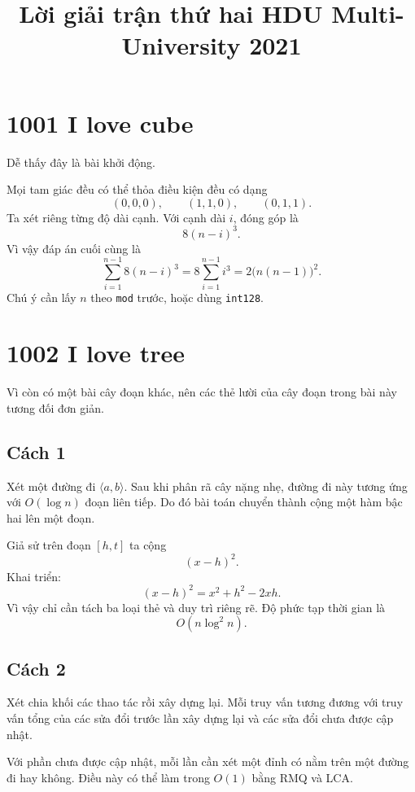 \documentclass[11pt]{article}
\title{Lời giải trận thứ hai HDU Multi-University 2021}
\author{}
\date{}
\begin{document}
\maketitle


\section{1001 I love cube}

Dễ thấy đây là bài khởi động.

Mọi tam giác đều có thể thỏa điều kiện đều có dạng
\[
  (0,0,0),\qquad (1,1,0),\qquad (0,1,1).
\]
Ta xét riêng từng độ dài cạnh. Với cạnh dài $i$, đóng góp là
\[
  8(n-i)^3.
\]
Vì vậy đáp án cuối cùng là
\[
  \sum_{i=1}^{n-1} 8(n-i)^3
  = 8\sum_{i=1}^{n-1} i^3
  = 2\bigl(n(n-1)\bigr)^2.
\]
Chú ý cần lấy $n$ theo \texttt{mod} trước, hoặc dùng \texttt{int128}.

\section{1002 I love tree}

Vì còn có một bài cây đoạn khác, nên các thẻ lười của cây đoạn trong bài này
tương đối đơn giản.

\subsection*{Cách 1}

Xét một đường đi $\langle a,b\rangle$. Sau khi phân rã cây nặng nhẹ, đường đi
này tương ứng với $O(\log n)$ đoạn liên tiếp. Do đó bài toán chuyển thành cộng
một hàm bậc hai lên một đoạn.

Giả sử trên đoạn $[h,t]$ ta cộng
\[
  (x-h)^2.
\]
Khai triển:
\[
  (x-h)^2 = x^2+h^2-2xh.
\]
Vì vậy chỉ cần tách ba loại thẻ và duy trì riêng rẽ. Độ phức tạp thời gian là
\[
  O(n\log^2 n).
\]

\subsection*{Cách 2}

Xét chia khối các thao tác rồi xây dựng lại. Mỗi truy vấn tương đương với
truy vấn tổng của các sửa đổi trước lần xây dựng lại và các sửa đổi chưa được
cập nhật.

Với phần chưa được cập nhật, mỗi lần cần xét một đỉnh có nằm trên một đường
đi hay không. Điều này có thể làm trong $O(1)$ bằng RMQ và LCA.
\end{document}
